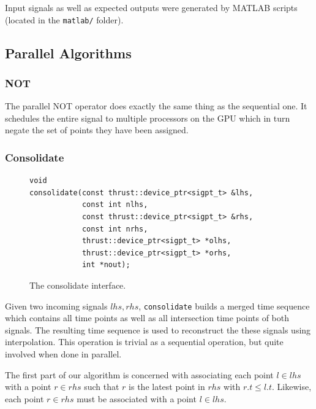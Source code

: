 \documentclass[a4paper,10pt]{article}
\begin{document}
Input signals as well as expected outputs were generated by MATLAB scripts (located
in the \verb|matlab/| folder).


\subsection{Parallel Algorithms}

\subsubsection{NOT}

The parallel NOT operator does exactly the same thing as the sequential one. It
schedules the entire signal to multiple processors on the GPU which in turn negate
the set of points they have been assigned.

\subsubsection{Consolidate}
\label{sec:consolidate}

\begin{figure}[H]
\begin{lstlisting}
void
consolidate(const thrust::device_ptr<sigpt_t> &lhs,
            const int nlhs,
            const thrust::device_ptr<sigpt_t> &rhs,
            const int nrhs,
            thrust::device_ptr<sigpt_t> *olhs,
            thrust::device_ptr<sigpt_t> *orhs,
            int *nout);
\end{lstlisting}
\caption{
\label{fig:parallel_consolidate}
The consolidate interface.}
\end{figure}

Given two incoming signals $lhs, rhs$, \lstinline|consolidate| builds a
merged time sequence which contains all time points as well as all intersection
time points of both signals. The resulting time sequence is used to reconstruct
the these signals using interpolation. This operation is trivial as a sequential
operation, but quite involved when done in parallel.

The first part of our algorithm is concerned with associating each point $l \in lhs$
with a point $r \in rhs$ such that $r$ is the latest point in $rhs$ with $r.t \leq l.t$. Likewise, each point $r \in rhs$ must be associated with a point $l \in lhs$.
\end{document}
